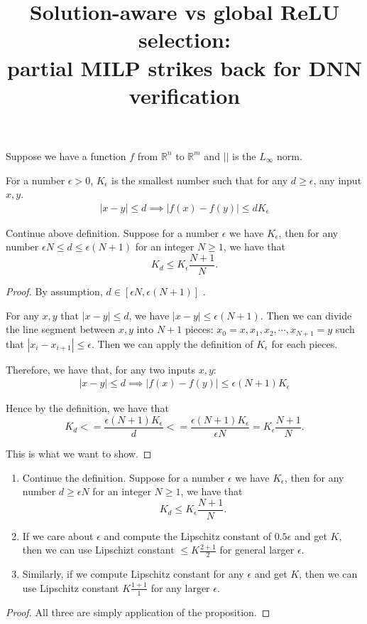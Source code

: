 \documentclass{llncs}
\title{Solution-aware vs global ReLU selection: \\
partial MILP strikes back for DNN verification}
\date{}
\begin{document}
\begin{definition}
	Suppose we have a function $f$ from $\mathbb{R}^n$ to $\mathbb{R}^m$ and $||$ is the $L_\infty$ norm. 
	
	For a number $\epsilon > 0$, $K_\epsilon$ is the smallest number such that for any $d\geq \epsilon$, any input $x,y$.
	\begin{align*}
	 |x-y| \leq d \implies |f(x)-f(y)| \leq dK_\epsilon 
	\end{align*}
\end{definition}



\begin{proposition}
	
	Continue above definition. Suppose for a number $\epsilon$ we have $K_\epsilon$, then for any number $ \epsilon N\leq d\leq \epsilon(N+1)$ for an integer $N \geq 1$, we have that $$K_d \leq K_\epsilon\frac{N+1}{N}.$$
\end{proposition}

\begin{proof}
By assumption, $d \in [\epsilon N  , \epsilon(N+1)]$ . 

	For any $x, y$ that $|x-y| \leq d$, we have $|x-y| \leq \epsilon(N+1) $. Then we can divide the line segment between $x, y$ into $N+1$ pieces: $x_0 = x, x_1, x_2, \cdots, x_{N+1} = y$ such that $|x_i-x_{i+1}| \leq \epsilon$. Then we can apply the definition of $K_\epsilon$ for each pieces. 
	
	Therefore, we have that, for any two inputs $x,y$:
		\begin{align*}
		|x-y| \leq d \implies |f(x)-f(y)| \leq  \epsilon(N+1) K_\epsilon
	\end{align*}
	
	Hence by the definition, we have that $$K_d <= \dfrac{\epsilon(N+1) K_\epsilon }{d}<=\dfrac{\epsilon(N+1)K_\epsilon}{\epsilon N} = K_\epsilon\frac{N+1}{N}.$$
	
	This is what we want to show.
	

\end{proof}


\begin{corollary}
	\begin{enumerate}
		\item Continue the definition. Suppose for a number $\epsilon$ we have $K_\epsilon$, then for any number $d\geq \epsilon N$ for an integer $N \geq 1$, we have that $$K_d \leq K_\epsilon\frac{N+1}{N}.$$
		
		\item 	If we care about $\epsilon$ and compute the Lipschitz constant of $0.5 \epsilon$ and get $K$, then we can use Lipschizt constant $\leq K\frac{2+1}{2}$ for general larger $\epsilon$.
		\item 	Similarly, if we compute Lipschitz constant for any $\epsilon$ and get $K$, then we can use Lipschitz constant $K\frac{1+1}{1}$ for any larger $\epsilon$.
	\end{enumerate}
\end{corollary}

\begin{proof}
	All three are simply application of the proposition.
\end{proof}

\begin{proposition}
	
\end{proposition}
\end{document}

